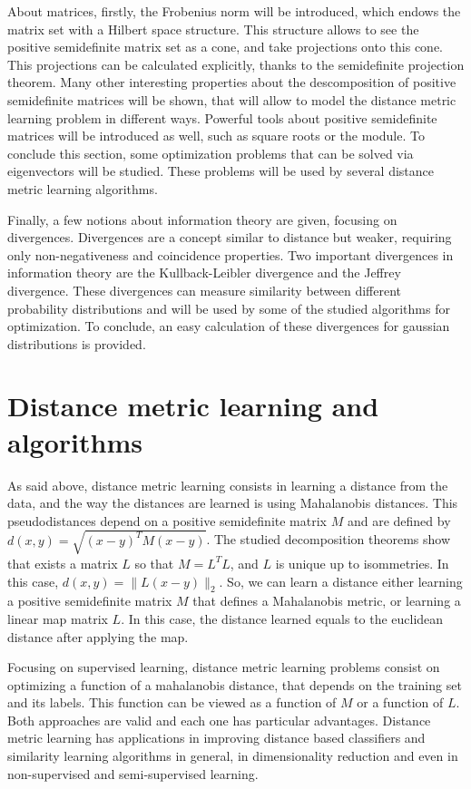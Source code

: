 About matrices, firstly, the Frobenius norm will be introduced, which endows the matrix set with a Hilbert space structure. This structure allows to see the positive semidefinite matrix set as a cone, and take projections onto this cone. This projections can be calculated explicitly, thanks to the semidefinite projection theorem. Many other interesting properties about the descomposition of positive semidefinite matrices will be shown, that will allow to model the distance metric learning problem in different ways. Powerful tools about positive semidefinite matrices will be introduced as well, such as square roots or the module. To conclude this section, some optimization problems that can be solved via eigenvectors will be studied. These problems will be used by several distance metric learning algorithms.

Finally, a few notions about information theory are given, focusing on divergences. Divergences are a concept similar to distance but weaker, requiring only non-negativeness and coincidence properties. Two important divergences in information theory are the Kullback-Leibler divergence and the Jeffrey divergence. These divergences can measure similarity between different probability distributions and will be used by some of the studied algorithms for optimization. To conclude, an easy calculation of these divergences for gaussian distributions is provided.

\section*{Distance metric learning and algorithms}

As said above, distance metric learning consists in learning a distance from the data, and the way the distances are learned is using Mahalanobis distances. This pseudodistances depend on a positive semidefinite matrix $M$ and are defined by $d(x,y) = \sqrt{(x-y)^TM(x-y)}$. The studied decomposition theorems show that exists a matrix $L$ so that $M = L^TL$, and $L$ is unique up to isommetries. In this case, $d(x,y) = \|L(x-y)\|_2$. So, we can learn a distance either learning a positive semidefinite matrix $M$ that defines a Mahalanobis metric, or learning a linear map matrix $L$. In this case, the distance learned equals to the euclidean distance after applying the map.

Focusing on supervised learning, distance metric learning problems consist on optimizing a function of a mahalanobis distance, that depends on the training set and its labels. This function can be viewed as a function of $M$ or a function of $L$. Both approaches are valid and each one has particular advantages. Distance metric learning has applications in improving distance based classifiers and similarity learning algorithms in general, in dimensionality reduction and even in non-supervised and semi-supervised learning.

